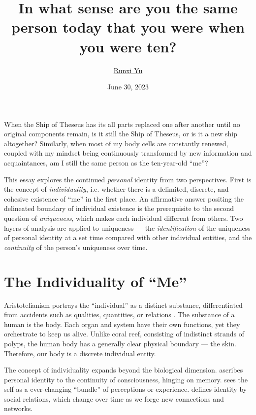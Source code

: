 \documentclass[a4paper,english,12pt]{scrartcl}
\begin{document}
\subject{2023 John Locke Essay Competition\\Philosophy Question 2}
\title{In what sense are you the same person today that you were when you were ten?}
\author{\href{https://www.andrewyu.org/}{Runxi Yu}}
\date{June 30, 2023}

\maketitle

\noindent When the Ship of Theseus has its all parts replaced one
after another until no original components remain, is it still the
Ship of Theseus, or is it a new ship altogether?  Similarly, when
most of my body cells are constantly renewed, coupled with my mindset
being continuously transformed by new information and acquaintances,
am I still the same person as the ten-year-old ``me''?

This essay explores the continued \emph{personal} identity from two
perspectives. First is the concept of \emph{individuality}, i.e. whether
there is a delimited, discrete, and cohesive existence of ``me''
in the first place. An affirmative answer positing the delineated
boundary of individual existence is the prerequisite to the second
question of \emph{uniqueness}, which makes each individual different
from others. Two layers of analysis are applied to uniqueness
--- the \emph{identification} of the uniqueness of personal identity
at a set time compared with other individual entities, and the \emph{continuity}
of the person's uniqueness over time.

\section{The Individuality of ``Me''}

Aristotelianism portrays the ``individual'' as a distinct substance,
differentiated from accidents such as qualities, quantities, or relations
\parencite{MetaphysicsZeta}. The substance of a human is the body.
Each organ and system have their own functions, yet they orchestrate
to keep us alive. Unlike coral reef, consisting of indistinct strands
of polyps, the human body has a generally clear physical boundary
--- the skin. Therefore, our body is a discrete individual
entity.

The concept of individuality expands beyond the biological dimension.
\textcite{LockeHumanUnderstanding} ascribes personal identity to
the continuity of consciousness, hinging on memory. \textcite{DavidHume} sees the self
as a ever-changing ``bundle'' of perceptions or experience. \textcite{Mead1934MindSA} defines identity by social relations,
which change over time as we forge new connections and networks.
\end{document}
